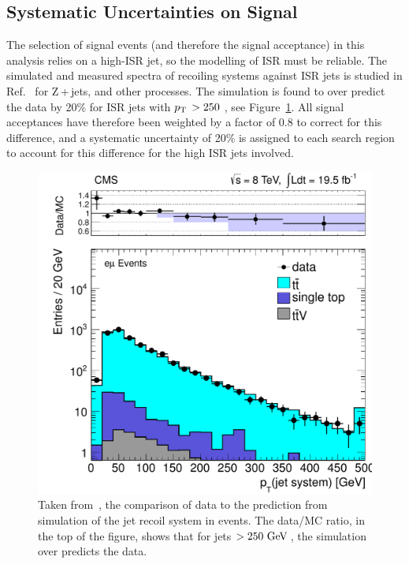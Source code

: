 \subsection{Systematic Uncertainties on Signal}
\label{sec:signalSYST}


The selection of signal events (and therefore the signal acceptance) in this analysis relies on a high-\pt ISR jet, so the modelling of ISR must be reliable.
The simulated and measured \pt spectra of recoiling systems against ISR jets is studied in Ref.~\cite{CMSsinglelep} for Z\,+\,jets, 
\ttbar and other processes. 
The simulation is found to over predict the data by 20\% for ISR jets with $p_{\text{T}}\, > 250$ \GeV, see Figure~\ref{fig:ISRsyst}.
All signal acceptances have therefore been weighted by a factor of 0.8 to correct for this difference, and a systematic uncertainty of 20\% is assigned to each search region to account for this difference for the high \pt ISR jets involved.

\begin{figure}[ht!]
  \begin{center}
  \includegraphics[scale=0.35]{Figures/sus13009/ISRmodellingSUS13011.pdf}
  \caption{Taken from~\cite{CMSsinglelep}, the comparison of data to the prediction from simulation of the jet recoil system in \ttbar events. The data/MC ratio, in the top of the figure, shows that for jets $>250~\mathrm{GeV}\,$, the simulation over predicts the data.
\label{fig:ISRsyst}}
  \end{center}
\end{figure}


